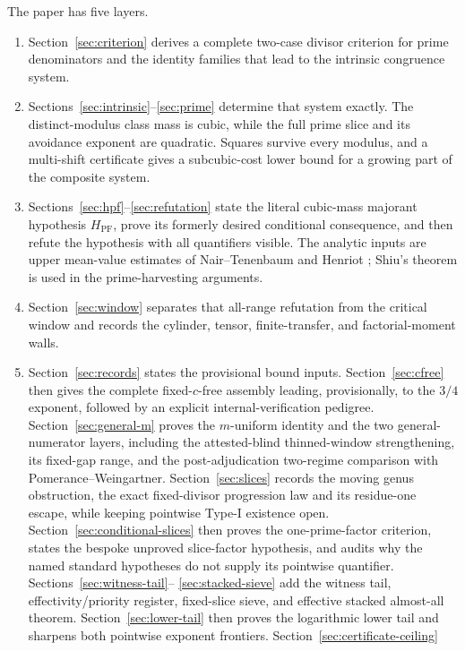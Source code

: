 \documentclass[10pt,reqno]{amsart}
\theoremstyle{definition}
\newcommand{\1}{\mathbf 1}
\newcommand{\PF}{H_{\mathrm{PF}}}
\begin{document}
The paper has five layers.
\begin{enumerate}[leftmargin=*,label=(\roman*)]
\item Section~\ref{sec:criterion} derives a complete two-case divisor criterion for prime denominators and the identity families that lead to the intrinsic congruence system.
\item Sections~\ref{sec:intrinsic}--\ref{sec:prime} determine that system exactly.  The distinct-modulus class mass is cubic, while the full prime slice and its avoidance exponent are quadratic.  Squares survive every modulus, and a multi-shift certificate gives a subcubic-cost lower bound for a growing part of the composite system.
\item Sections~\ref{sec:hpf}--\ref{sec:refutation} state the literal cubic-mass majorant hypothesis $\PF$, prove its formerly desired conditional consequence, and then refute the hypothesis with all quantifiers visible.  The analytic inputs are upper mean-value estimates of Nair--Tenenbaum \cite{NairTenenbaum} and Henriot \cite{Henriot}; Shiu's theorem \cite{Shiu} is used in the prime-harvesting arguments.
\item Section~\ref{sec:window} separates that all-range refutation from the critical window and records the cylinder, tensor, finite-transfer, and factorial-moment walls.
\item Section~\ref{sec:records} states the provisional bound inputs.
Section~\ref{sec:cfree} then gives the complete fixed-$c$-free assembly
leading, provisionally, to the $3/4$ exponent, followed by an explicit
internal-verification pedigree.  Section~\ref{sec:general-m} proves the
$m$-uniform identity and the two general-numerator layers, including the
attested-blind thinned-window strengthening, its fixed-gap range, and the
post-adjudication two-regime comparison with Pomerance--Weingartner.
Section~\ref{sec:slices} records the moving genus obstruction, the exact
fixed-divisor progression law and its residue-one escape, while keeping
pointwise Type-I existence open.  Section~\ref{sec:conditional-slices}
then proves the one-prime-factor criterion, states the bespoke unproved
slice-factor hypothesis, and audits why the named standard hypotheses do
not supply its pointwise quantifier.  Sections~\ref{sec:witness-tail}--
\ref{sec:stacked-sieve} add the witness tail, effectivity/priority register,
fixed-slice sieve, and effective stacked almost-all theorem.  Section~\ref{sec:lower-tail} then proves the logarithmic lower tail and
sharpens both pointwise exponent frontiers.  Section~\ref{sec:certificate-ceiling}

\end{enumerate}
\end{document}
